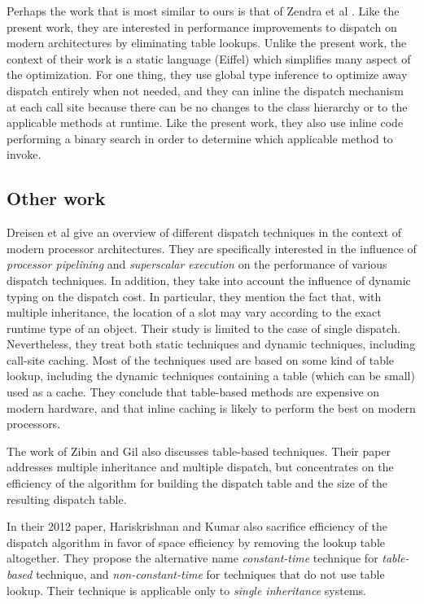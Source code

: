 Perhaps the work that is most similar to ours is that of Zendra et al
\cite{Zendra:1997:EDD:263698.263728}.  Like the present work, they are
interested in performance improvements to dispatch on modern
architectures by eliminating table lookups.  Unlike the present work,
the context of their work is a static language (Eiffel) which
simplifies many aspect of the optimization.  For one thing, they use
global type inference to optimize away dispatch entirely when not
needed, and they can inline the dispatch mechanism at each call site
because there can be no changes to the class hierarchy or to the
applicable methods at runtime.  Like the present work, they also use
inline code performing a binary search in order to determine which
applicable method to invoke.

\subsection{Other work}

Dreisen et al \cite{Driesen:1995:MDP:646153.679537} give an overview
of different dispatch techniques in the context of modern processor
architectures.  They are specifically interested in the influence of
\emph{processor pipelining} and \emph{superscalar execution} on the
performance of various dispatch techniques.  In addition, they take
into account the influence of dynamic typing on the dispatch cost.  In
particular, they mention the fact that, with multiple inheritance, the
location of a slot may vary according to the exact runtime type of an
object.  Their study is limited to the case of single dispatch.
Nevertheless, they treat both static techniques and dynamic
techniques, including call-site caching.  Most of the techniques used
are based on some kind of table lookup, including the dynamic
techniques containing a table (which can be small) used as a cache.
They conclude that table-based methods are expensive on modern
hardware, and that inline caching is likely to perform the best on
modern processors.

The work of Zibin and Gil \cite{Zibin:2002:FAC:582419.582434} also
discusses table-based techniques.  Their paper addresses multiple
inheritance and multiple dispatch, but concentrates on the efficiency
of the algorithm for building the dispatch table and the size of the
resulting dispatch table. 

In their 2012 paper, Hariskrishnan and Kumar
\cite{Harikrishnan:2012:SEN:2108144.2108153} also sacrifice efficiency
of the dispatch algorithm in favor of space efficiency by removing the
lookup table altogether.  They propose the alternative name
\emph{constant-time} technique for \emph{table-based} technique, and
\emph{non-constant-time} for techniques that do not use table lookup.
Their technique is applicable only to \emph{single inheritance} systems. 

